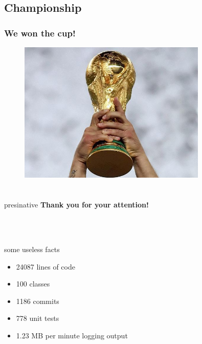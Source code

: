 \documentclass[hyperref={pdfpagelabels=false},compress]{beamer}
\begin{document}
\subsection{Championship}
\begin{frame}
	\frametitle{We won the cup!}
	\begin{center}
	    \begin{figure}
	        \includegraphics[width=0.8\textwidth]{wm}
	    \end{figure}
	\end{center}
\end{frame}

\section{}
\begin{frame}
	\hfill
	\begin{beamercolorbox}[shadow=true, rounded=true, wd=10cm]{presinative}
		\centering
		\Large{\textbf{Thank you for your attention!}}
	\end{beamercolorbox}
	\hfill \\
	\hfill \\
	\begin{block}{some useless facts}
		\begin{itemize}
			\item 24087 lines of code
			\item 100 classes
			\item 1186 commits
			\item 778 unit tests
			\item 1.23 MB per minute logging output
		\end{itemize}
	\end{block}
\end{frame}
\end{document}
